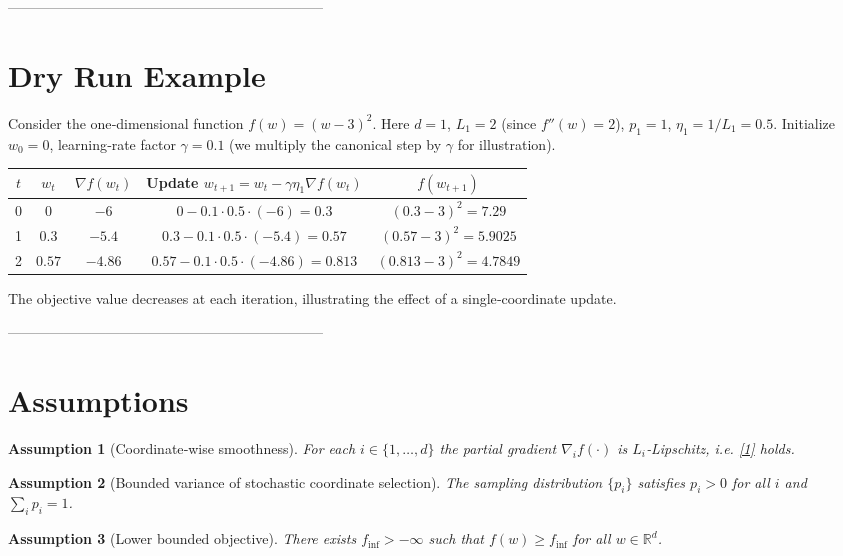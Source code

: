 \documentclass{article}
\newcommand{\R}{\mathbb{R}}
\newtheorem{assumption}{Assumption}
\begin{document}
--------------------------------------------------------------------

\section*{Dry Run Example}
Consider the one‑dimensional function $f(w)=(w-3)^2$.
Here $d=1$, $L_1=2$ (since $f''(w)=2$), $p_1=1$, $\eta_1=1/L_1=0.5$.
Initialize $w_0=0$, learning‑rate factor $\gamma=0.1$ (we multiply the canonical step by $\gamma$ for illustration).

\begin{center}
\begin{tabular}{c|c|c|c|c}
$t$ & $w_t$ & $\nabla f(w_t)$ & Update $w_{t+1}=w_t-\gamma\eta_1\nabla f(w_t)$ & $f(w_{t+1})$\\ \hline
0 & $0$ & $-6$ & $0-0.1\cdot0.5\cdot(-6)=0.3$ & $(0.3-3)^2=7.29$\\
1 & $0.3$ & $-5.4$ & $0.3-0.1\cdot0.5\cdot(-5.4)=0.57$ & $(0.57-3)^2=5.9025$\\
2 & $0.57$ & $-4.86$ & $0.57-0.1\cdot0.5\cdot(-4.86)=0.813$ & $(0.813-3)^2=4.7849$\\
\end{tabular}
\end{center}
The objective value decreases at each iteration, illustrating the effect of a single‑coordinate update.

--------------------------------------------------------------------

\section*{Assumptions}
\begin{assumption}[Coordinate‑wise smoothness]\label{ass:smooth}
For each $i\in\{1,\dots,d\}$ the partial gradient $\nabla_i f(\cdot)$ is $L_i$‑Lipschitz, i.e. \eqref{1} holds.
\end{assumption}

\begin{assumption}[Bounded variance of stochastic coordinate selection]\label{ass:prob}
The sampling distribution $\{p_i\}$ satisfies $p_i>0$ for all $i$ and $\sum_i p_i=1$.
\end{assumption}

\begin{assumption}[Lower bounded objective]\label{ass:lb}
There exists $f_{\inf}>-\infty$ such that $f(w)\ge f_{\inf}$ for all $w\in\R^{d}$.
\end{assumption}
\end{document}
